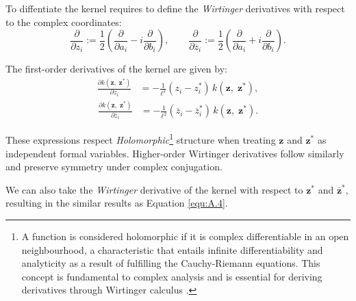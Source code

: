To diffentiate the kernel requires to define the \textit{Wirtinger} derivatives with respect to the complex coordinates:
\[
\frac{\partial}{\partial z_i} := \frac{1}{2} \left( \frac{\partial}{\partial a_i} - i \frac{\partial}{\partial b_i} \right), \qquad
\frac{\partial}{\partial \overline{z}_i} := \frac{1}{2} \left( \frac{\partial}{\partial a_i} + i \frac{\partial}{\partial b_i} \right).
\]

The first-order derivatives of the kernel are given by:
\begin{equation} \label{equ:A.20}
\boxed{
\begin{aligned}
\frac{\partial k(\mathbf{z},\;\mathbf{z}^*)}{\partial z_i} &= -\frac{1}{\ell^2} (z_i - z_i^*) \, k(\mathbf{z},\;\mathbf{z}^*),  
\end{aligned}
}
\end{equation}
\begin{equation} \label{equ:A.21}
\boxed{
\begin{aligned}
\frac{\partial k(\mathbf{z},\;\mathbf{z}^*)}{\partial \overline{z}_i} &= -\frac{1}{\ell^2} (\overline{z}_i - \overline{z}_i^*) \, k(\mathbf{z},\;\mathbf{z}^*). 
\end{aligned}
}
\end{equation}

These expressions respect \textit{Holomorphic}\footnote{A function is considered holomorphic if it is complex differentiable in an open neighbourhood, a characteristic that entails infinite differentiability and analyticity as a result of fulfilling the Cauchy-Riemann equations.  This concept is fundamental to complex analysis and is essential for deriving derivatives through Wirtinger calculus \cite{stein2003}.} structure when treating \(\mathbf{z}\) and \(\mathbf{z}^*\) as independent formal variables. Higher-order Wirtinger derivatives follow similarly and preserve symmetry under complex conjugation.

We can also take the \textit{Wirtinger} derivative of the kernel with respect to $\mathbf{z}^*$ and $\overline{\mathbf{z}}^*$, resulting in the similar results as Equation \eqref{equ:A.4}.

